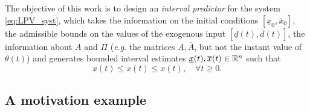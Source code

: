 \documentclass[twocolumn,english]{IEEEtran}
\theoremstyle{plain}
\theoremstyle{definition}
\theoremstyle{plain}
\theoremstyle{plain}
\theoremstyle{remark}
\begin{document}
The objective of this work is to design an \emph{interval predictor} for the system \eqref{eq:LPV_syst}, which takes the information on the initial conditions $[\underline{x}_{0},\overline{x}_{0}]$, the admissible bounds on the values of the exogenous input $[\underline{d}(t),\overline{d}(t)]$, the information about $A$ and $\Pi$ (\emph{e.g}. the matrices $\underline{A},\overline{A}$, but not the instant value of $\theta(t)$) and generates bounded interval estimates $\underline{x}(t),\overline{x}(t)\in\mathbb{R}^{n}$ such that
\begin{equation}
\underline{x}(t)\leq x(t)\leq\overline{x}(t),\quad\forall t\geq0.\label{eq:Interval_Goal}
\end{equation}

\subsection{A motivation example}
\end{document}
